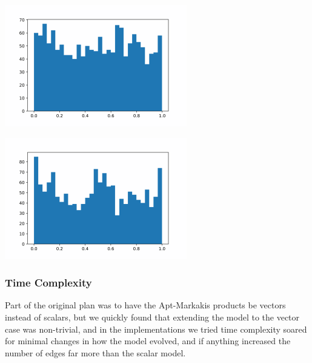 \documentclass[12pt,twoside]{report}
\begin{document}
\begin{center}
\begin{minipage}{0.45\linewidth}
\includegraphics[width=\linewidth]{figures/hist4.png}
\end{minipage}
\hfill
\begin{minipage}{0.45\linewidth}
\includegraphics[width=\linewidth]{figures/hist2.png}
\end{minipage}
\end{center}


\subsubsection{Time Complexity}

Part of the original plan was to have the Apt-Markakis products be vectors instead of scalars, but we quickly found that extending the model to the vector case was non-trivial, and in the implementations we tried time complexity soared for minimal changes in how the model evolved, and if anything increased the number of edges far more than the scalar model. \\
\end{document}
